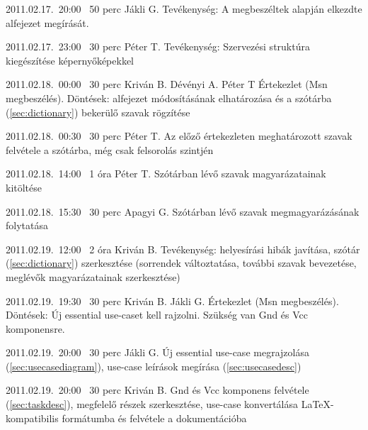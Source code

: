 \begin{naplo}
\bejegyzes
{2011.02.17.~20:00~}
{50 perc}
{Jákli G.}
{Tevékenység: A megbeszéltek alapján el\-kezdte  alfejezet megírását.}

\bejegyzes
{2011.02.17.~23:00~}
{30 perc}
{Péter T.}
{Tevékenység: Szervezési struktúra kiegészí\-tése képernyőképekkel}

\bejegyzes
{2011.02.18.~00:00~}
{30 perc}
{Kriván B.\newline
Dévényi A.\newline
Péter T}
{Értekezlet (Msn megbeszélés).\newline
Döntések:  alfejezet módosításának elhatározása és a szótárba (\ref{sec:dictionary}) bekerülő szavak rögzítése}

\bejegyzes
{2011.02.18.~00:30~}
{30 perc}
{Péter T.}
{Az előző értekezleten meghatározott szavak felvétele a szótárba, még csak felsorolás szint\-jén}

\bejegyzes
{2011.02.18.~14:00~}
{1 óra}
{Péter T.}
{Szótárban lévő szavak magyarázatainak kitöl\-tése}

\bejegyzes
{2011.02.18.~15:30~}
{30 perc}
{Apagyi G.}
{Szótárban lévő szavak megmagyarázásának folytatása}

\bejegyzes
{2011.02.19.~12:00~}
{2 óra}
{Kriván B.}
{Tevékenység: helyesírási hibák javítása, szó\-tár (\ref{sec:dictionary}) szerkesztése (sorrendek változtatása, további szavak bevezetése, meglévők magya\-rázatainak szerkesztése)}

\bejegyzes
{2011.02.19.~19:30~}
{30 perc}
{Kriván B.\newline
Jákli G.}
{Értekezlet (Msn megbeszélés).\newline
Döntések: Új essential use-caset kell rajzolni. Szükség van Gnd és Vcc komponensre.}

\bejegyzes
{2011.02.19.~20:00~}
{30 perc}
{Jákli G.}
{Új essential use-case megrajzolása (\ref{sec:usecasediagram}), use-case leírások megírása (\ref{sec:usecasedesc})}

\bejegyzes
{2011.02.19.~20:00~}
{30 perc}
{Kriván B.}
{Gnd és Vcc komponens felvétele (\ref{sec:taskdesc}), megfelelő részek szerkesztése, use-case konvertálása \LaTeX{}-kompatibilis formátumba és felvétele a dokumentációba}

\end{naplo}

